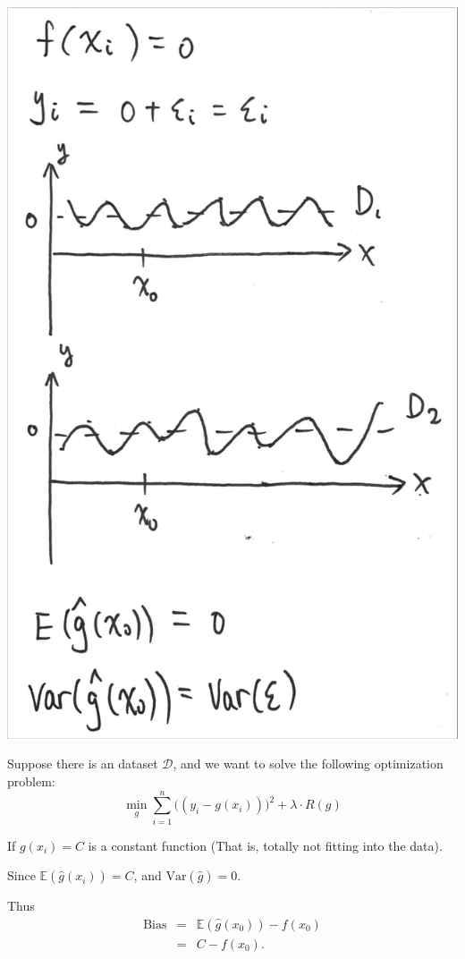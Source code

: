 \documentclass{article}
\theoremstyle{MyNonumberplain}
\theoremstyle{break}
\newcommand{\ev}{\mathbb{E}}
\newcommand{\var}{\text{Var}}
\newcommand{\bias}{\text{Bias}}
\theoremstyle{break}
\begin{document}
\begin{center}
    \includegraphics*[scale=0.1]{Images/img5.jpg}
\end{center}

Suppose there is an dataset $\mathcal{D}$, and we want to solve the following optimization problem: $$\min_g\sum_{i=1}^{n}\bigl((y_i-g(x_i))\bigr)^2+\lambda\cdot R(g)$$

If $g(x_i)=C$ is a constant function (That is, totally not fitting into the data).

Since $\ev(\hat{g}(x_i))=C$, and $\var(\hat{g})=0$.

Thus 
\begin{eqnarray*}
    \bias &=&\ev(\hat{g}(x_0))-f(x_0)\\
          &=& C-f(x_0).
\end{eqnarray*}
\end{document}
